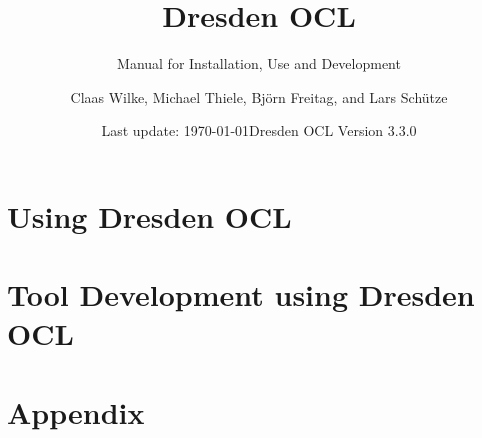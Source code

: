 


\title{Dresden OCL}
\subtitle{Manual for Installation, Use and Development}
\author{Claas Wilke, Michael Thiele,
	Bj\"{o}rn Freitag, and Lars Sch\"{u}tze}
\date{Last update: \today\newline Dresden OCL Version 3.3.0}


\usepackage[
  bookmarksnumbered=true,
  pdftitle={Dresden OCL - Manual},
  pdfauthor={Claas Wilke},
  pdfcreator={TeXstudio},
  pdfkeywords={OCL, Dresden OCL, constraints},
  pdfsubject={The Dresden OCL Manual}
]{hyperref}

\hypersetup{
  colorlinks=true,
  linkcolor=HKS41,
  citecolor=HKS41,
  filecolor=HKS41,
  menucolor=HKS41,
  urlcolor=HKS41
} 


\maketitle




\tableofcontents

\part{Using Dresden OCL}








\part{Tool Development using Dresden OCL}







%



\part{Appendix}
\appendix




